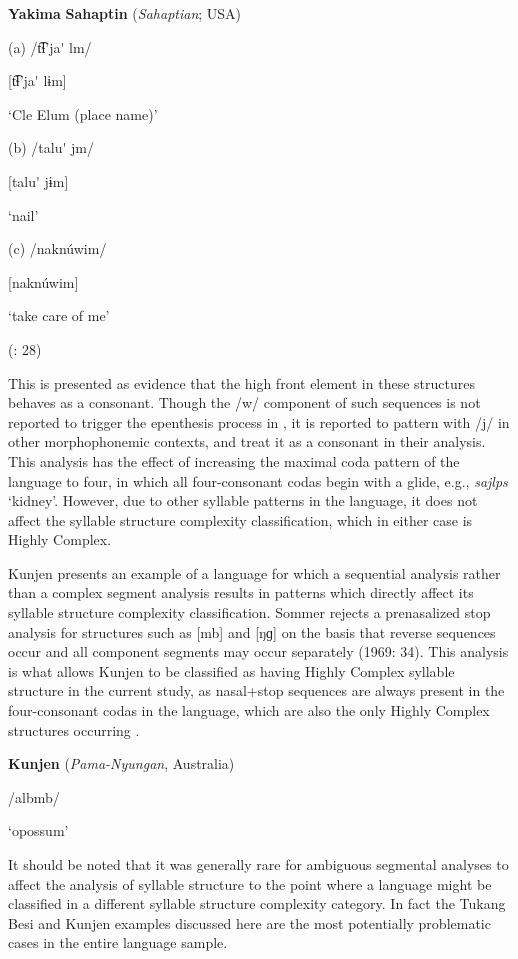 \ea\label{ex:(4.7)}
  \textbf{Yakima} \textbf{Sahaptin} (\textit{Sahaptian}; USA)

(a)  /t͡ɬ’ja\'{} lm/

  [t͡ɬ’ja\'{} lɨm]

  ‘Cle Elum (place name)’

(b)  /talu\'{} jm/

  [talu\'{} jɨm]

  ‘nail’

(c)  /naknúwim/

  [naknúwim]

  ‘take care of me’

(\citealt{HargusBeavert2006}: 28)

\z

This is presented as evidence that the high front element in these structures behaves as a consonant. Though the /w/ component of such sequences is not reported to trigger the epenthesis process in , it is reported to pattern with /j/ in other morphophonemic contexts, and \citet{HargusBeavert2006} treat it as a consonant in their analysis. This analysis has the effect of increasing the maximal coda pattern of the language to four, in which all four-consonant codas begin with a glide, e.g., \textit{sajlps} ‘kidney’. However, due to other syllable patterns in the language, it does not affect the syllable structure complexity classification, which in either case is Highly Complex.

  Kunjen presents an example of a language for which a sequential analysis rather than a complex segment analysis results in patterns which directly affect its syllable structure complexity classification. Sommer rejects a prenasalized stop analysis for structures such as [mb] and [ŋɡ] on the basis that reverse sequences occur and all component segments may occur separately (1969: 34). This analysis is what allows Kunjen to be classified as having Highly Complex syllable structure in the current study, as nasal+stop sequences are always present in the four-consonant codas in the language, which are also the only Highly Complex structures occurring .

\ea\label{ex:(4.8)}
   \textbf{Kunjen} (\textit{Pama-Nyungan}, Australia)

/albmb/

\glt ‘opossum’

\citep[33]{Sommer1969}

\z

  It should be noted that it was generally rare for ambiguous segmental analyses to affect the analysis of syllable structure to the point where a language might be classified in a different syllable structure complexity category. In fact the Tukang Besi and Kunjen examples discussed here are the most potentially problematic cases in the entire language sample.

